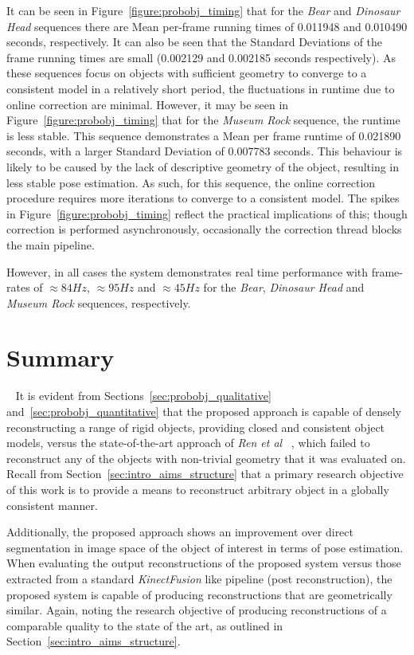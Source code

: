 It can be seen in Figure~\ref{figure:probobj_timing} that for the \textit{Bear} and 
\textit{Dinosaur Head} sequences there are Mean per-frame running times of 0.011948 and 
0.010490 seconds, respectively. It can also be seen that the Standard Deviations of the frame 
running times are small (0.002129 and 0.002185 seconds respectively). As these sequences focus on objects 
with sufficient geometry to converge to a consistent model in a relatively short period, the 
fluctuations in runtime due to online correction are minimal. However, it may be seen in 
Figure~\ref{figure:probobj_timing} that for the \textit{Museum Rock} sequence, the runtime is 
less stable. This sequence demonstrates a Mean per frame runtime of 0.021890 seconds, with 
a larger Standard Deviation of 0.007783 seconds. This behaviour is likely to be caused by the lack of 
descriptive geometry of the object, resulting in less stable pose estimation. As such, for this 
sequence, the online correction procedure requires more iterations to converge to a consistent 
model. The spikes in Figure~\ref{figure:probobj_timing} reflect the practical implications of 
this; though correction is performed asynchronously, occasionally the correction thread blocks the 
main pipeline.

However, in all cases the system demonstrates real time performance with frame-rates of 
\( \approx 84Hz \), \( \approx 95Hz \) and \( \approx 45Hz \) for the \textit{Bear}, 
\textit{Dinosaur Head} and \textit{Museum Rock} sequences, respectively.

\section{Summary}
~\label{sec:probobj_discussion}
It is evident from Sections~\ref{sec:probobj_qualitative} and~\ref{sec:probobj_quantitative} 
that the proposed approach is capable of densely reconstructing a range of rigid objects, providing 
closed and consistent object models, versus the state-of-the-art approach of \textit{Ren et al} 
~\cite{Ren2013}, which failed to reconstruct any of the objects with non-trivial geometry that it 
was evaluated on. Recall from Section~\ref{sec:intro_aims_structure} that a primary research objective 
of this work is to provide a means to reconstruct arbitrary object in a globally consistent manner.

Additionally, the proposed approach shows an improvement over direct segmentation 
in image space of the object of interest in terms of pose estimation. When evaluating the output 
reconstructions of the proposed system versus those extracted from a standard \textit{KinectFusion} 
like pipeline (post reconstruction), the proposed system is capable of producing reconstructions that 
are geometrically similar. Again, noting the research objective of producing reconstructions of a 
comparable quality to the state of the art, as outlined in Section~\ref{sec:intro_aims_structure}.

